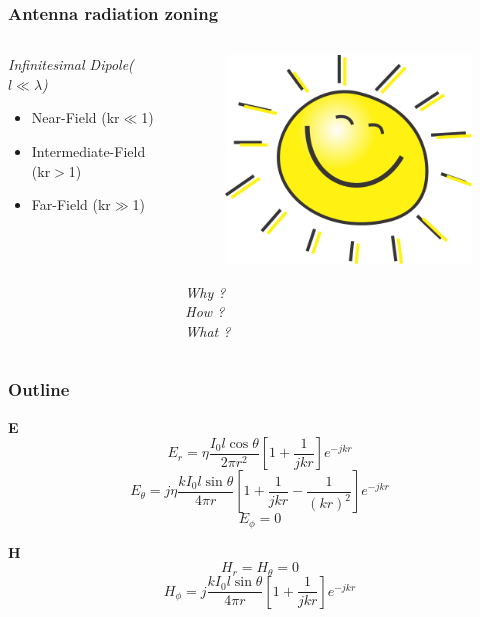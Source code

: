 \documentclass[compress=true]{beamer}
\begin{document}
\begin{frame}
  \frametitle{Antenna radiation zoning}
\begin{columns}
\begin{column}{0.7\textwidth}
{\it{\large{Infinitesimal Dipole(${l\ll \lambda}$)}}}
  \begin{itemize}
    \item Near-Field (kr$\ll$1) %
    \item Intermediate-Field (kr$>$1) %
    \item Far-Field (kr$\gg$1)
  \end{itemize}
\end{column}
\begin{column}{0.3\textwidth}
  \begin{figure}
    \includegraphics[height=0.2\textheight]{sunny_happy_day.png}
  \end{figure}
{\huge \em{Why ?\\
How ?\\
What ?\\}}
\end{column}
\end{columns}
\end{frame}
\begin{frame}
  \frametitle{Outline}
  \begin{block}{\bf E}
    $$E_r = \eta\frac{I_0l\cos{\theta}}{2\pi r^2}[1+\frac{1}{jkr}]e^{-jkr}$$
    $$E_{\theta} = j\eta\frac{kI_0l\sin{\theta}}{4\pi r}[1+\frac{1}{jkr}-\frac{1}{(kr)^2}]e^{-jkr}$$
    $$E_{\phi}=0$$
  \end{block}
  \begin{block}{\bf H}
    $$H_r=H_{\theta}=0$$
    $$H_{\phi}=j\frac{kI_0l\sin{\theta}}{4\pi r}[1+\frac{1}{jkr}]e^{-jkr}$$
  \end{block}
\end{frame}
\end{document}
